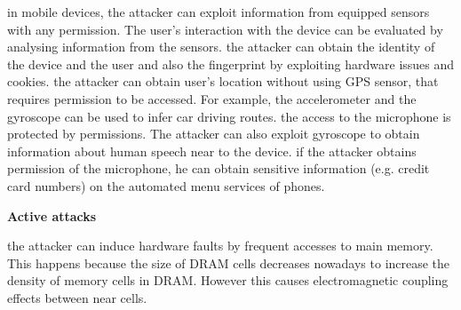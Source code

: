 \begin{itemize}
{in mobile devices, the attacker can exploit information from equipped sensors with any permission. The user's interaction with the device can be evaluated by analysing information from the sensors.}
{the attacker can obtain the identity of the device and the user and also the fingerprint by exploiting hardware issues and cookies.}
{the attacker can obtain user's location without using GPS sensor, that requires permission to be accessed. For example, the accelerometer and the gyroscope can be used to infer car driving routes.}
{the access to the microphone is protected by permissions. The attacker can also exploit gyroscope to obtain information about human speech near to the device.}
{if the attacker obtains permission of the microphone, he can obtain sensitive information (e.g. credit card numbers) on the automated menu services of phones.}
\end{itemize}
\vspace{2cm}
\textbf{Active attacks}
\begin{itemize}
{the attacker can induce hardware faults by frequent accesses to main memory. This happens because the size of DRAM cells decreases nowadays to increase the density of memory cells in DRAM. However this causes electromagnetic coupling effects between near cells.}
\end{itemize}

